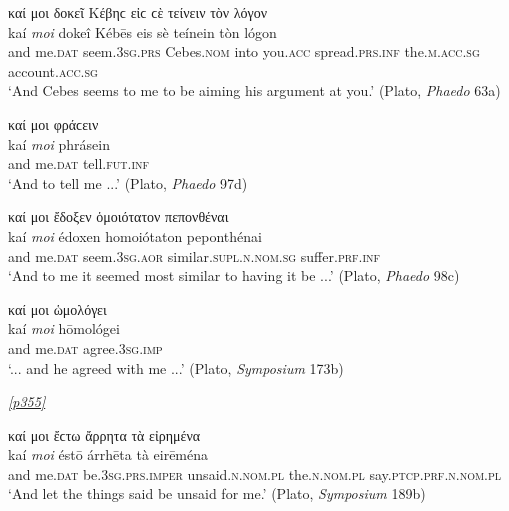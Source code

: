 \begin{exe}
\ex καί μοι δοκεῖ Κέβηϲ εἰϲ ϲὲ τείνειν τὸν λόγον\\
\gll kaí \emph{moi} dokeî Kébēs eis sè teínein tòn lógon\\
and me.\textsc{dat} seem.\textsc{3sg.prs} Cebes.\textsc{nom} into
you.\textsc{acc} spread.\textsc{prs.inf} the.\textsc{m.acc.sg}
account.\textsc{acc.sg}\\
\trans `And Cebes seems to me to be aiming his argument at you.' (Plato, \textit{Phaedo} 63a)\\
\label{kaimoi41}
\end{exe}

\begin{exe}
\ex καί μοι φράϲειν\\
\gll kaí \emph{moi} phrásein\\
and me.\textsc{dat} tell.\textsc{fut.inf}\\
`And to tell me ...' \trans (Plato, \textit{Phaedo} 97d)
\label{kaimoi42}
\end{exe}

\begin{exe}
\ex καί μοι ἔδοξεν ὁμοιότατον πεπονθέναι\\
\gll kaí \emph{moi} édoxen homoiótaton peponthénai\\
and me.\textsc{dat} seem.\textsc{3sg.aor} similar.\textsc{supl.n.nom.sg} suffer.\textsc{prf.inf}\\
\trans `And to me it seemed most similar to having it be ...' (Plato, \textit{Phaedo} 98c)
\label{kaimoi43}
\end{exe}

\begin{exe}
\ex καί μοι ὡμολόγει\\
\gll kaí \emph{moi} hōmológei\\
and me.\textsc{dat} agree.\textsc{3sg.imp}\\
\trans `... and he agreed with me ...' (Plato, \textit{Symposium} 173b)
\label{kaimoi44}
\end{exe}

\hyperlink{p355}{\emph{[p355]}}

\begin{exe}
\ex καί μοι ἔϲτω ἄρρητα τὰ εἰρημένα\\
\gll kaí \emph{moi} éstō árrhēta tà eirēména\\
and me.\textsc{dat} be.\textsc{3sg.prs.imper} unsaid.\textsc{n.nom.pl}
the.\textsc{n.nom.pl} say.\textsc{ptcp.prf.n.nom.pl}\\
\trans `And let the things said be unsaid for me.' (Plato, \textit{Symposium} 189b)
\label{kaimoi45}
\end{exe}

